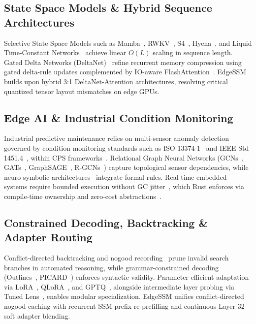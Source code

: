 \documentclass[journal]{IEEEtran}
\begin{document}
\subsection{State Space Models \& Hybrid Sequence Architectures}
Selective State Space Models such as Mamba~\cite{gu2023mamba}, RWKV~\cite{peng2023rwkv}, S4~\cite{gu2021s4}, Hyena~\cite{poli2023hyena}, and Liquid Time-Constant Networks~\cite{hasani2021liquid} achieve linear $O(L)$ scaling in sequence length. Gated Delta Networks (DeltaNet)~\cite{yang2024gateddelta} refine recurrent memory compression using gated delta-rule updates complemented by IO-aware FlashAttention~\cite{dao2022flashattention}. EdgeSSM builds upon hybrid 3:1 DeltaNet-Attention architectures, resolving critical quantized tensor layout mismatches on edge GPUs.

\subsection{Edge AI \& Industrial Condition Monitoring}
Industrial predictive maintenance relies on multi-sensor anomaly detection~\cite{zhao2019dl,malhotra2016lstm} governed by condition monitoring standards such as ISO 13374-1~\cite{iso13374} and IEEE Std 1451.4~\cite{ieee1451}, within CPS frameworks~\cite{schwabacher2005prognostics,jardine2006cbm,lee2015cps}. Relational Graph Neural Networks (GCNs~\cite{kipf2017gcn}, GATs~\cite{velickovic2018gat}, GraphSAGE~\cite{hamilton2017graphsage}, R-GCNs~\cite{schlichtkrull2018rgcn}) capture topological sensor dependencies, while neuro-symbolic architectures~\cite{kautz2022thirdwave,trinh2024alphageometry} integrate formal rules. Real-time embedded systems require bounded execution without GC jitter~\cite{kopetz2011realtime}, which Rust enforces via compile-time ownership and zero-cost abstractions~\cite{klabnik2019rust}.

\subsection{Constrained Decoding, Backtracking \& Adapter Routing}
Conflict-directed backtracking and nogood recording~\cite{marquessilva1999grasp,biere2009sat} prune invalid search branches in automated reasoning, while grammar-constrained decoding (Outlines~\cite{willard2023outlines}, PICARD~\cite{scholak2021picard}) enforces syntactic validity. Parameter-efficient adaptation via LoRA~\cite{hu2022lora}, QLoRA~\cite{dettmers2023qlora}, and GPTQ~\cite{frantar2022gptq}, alongside intermediate layer probing via Tuned Lens~\cite{belrose2023tunedlens}, enables modular specialization. EdgeSSM unifies conflict-directed nogood caching with recurrent SSM prefix re-prefilling and continuous Layer-32 soft adapter blending.
\end{document}
